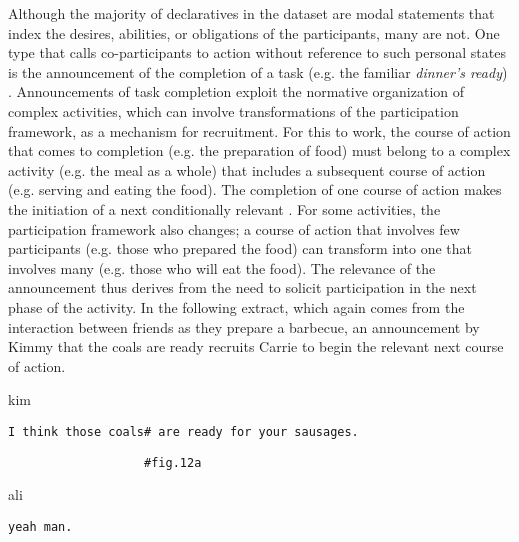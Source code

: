 \documentclass[output=paper,nonflat,modfont,draft]{langsci/langscibook}
\begin{document}
Although the majority of declaratives in the dataset are modal statements that index the desires, abilities, or obligations of the participants, many are not. One type that calls co-participants to action without reference to such personal states is the announcement of the completion of a task (e.g. the familiar \textit{dinner’s ready}) \citep[cf.][384]{Rossi2018}. Announcements of task completion exploit the normative organization of complex activities, which can involve transformations of the participation framework, as a mechanism for recruitment. For this to work, the course of action that comes to completion (e.g. the preparation of food) must belong to a complex activity (e.g. the meal as a whole) that includes a subsequent course of action (e.g. serving and eating the food). The completion of one course of action makes the initiation of a next conditionally relevant \citep[cf.][213--215]{schegloff_sequence_2007}. For some activities, the participation framework also changes; a course of action that involves few participants (e.g. those who prepared the food) can transform into one that involves many (e.g. those who will eat the food). The relevance of the announcement thus derives from the need to solicit participation in the next phase of the activity. In the following extract, which again comes from the interaction between friends as they prepare a barbecue, an announcement by Kimmy that the coals are ready recruits Carrie to begin the relevant next course of action.


\begin{mdframedkendrick}[style=firstfoc]
\begin{transbox}{1}{kim}
\begin{verbatim}
I think those coals# are ready for your sausages.
\end{verbatim}
\end{transbox}
\end{mdframedkendrick}\vspace{-5mm}

\begin{transbox}{2}{\fig}
\begin{verbatim}
                   #fig.12a
\end{verbatim}
\end{transbox}

\begin{transbox}{3}{ali}
\begin{verbatim}
yeah man.
\end{verbatim}
\end{transbox}
\end{document}
